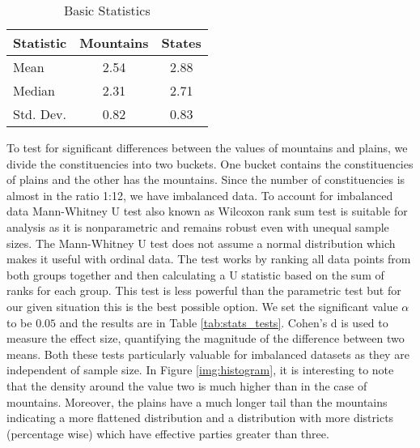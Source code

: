     \label{img:histogram}

\begin{table}[h]
\centering
\begin{tabular}{|l|c|c|}
\hline
Statistic & Mountains & States \\
\hline
Mean & 2.54 & 2.88 \\
Median & 2.31 & 2.71 \\
Std. Dev. & 0.82 & 0.83 \\
\hline
\end{tabular}
\caption{Basic Statistics}

\label{tab:basic_stats}
\end{table}

To test for significant differences between the values of mountains and plains, we divide the constituencies into two buckets. One bucket contains the constituencies of plains and the other has the mountains. Since the number of constituencies is almost in the ratio 1:12, we have imbalanced data. To account for imbalanced data Mann-Whitney U test also known as  Wilcoxon rank sum test is suitable for analysis as it is nonparametric and remains robust even with unequal sample sizes. The Mann-Whitney U test does not assume a normal distribution which makes it  useful with ordinal data. The test works by ranking all data points from both groups together and then calculating a U statistic based on the sum of ranks for each group. This test is less powerful than the parametric test but for our given situation this is the best possible option. We set the significant value $\alpha$ to be $0.05$ and the results are in Table \ref{tab:stats_tests}. Cohen's d is used to measure the effect size, quantifying the magnitude of the difference between two means. Both these tests particularly valuable for imbalanced datasets as they are independent of sample size. In Figure \ref{img:histogram}, it is interesting to note that the density around the value two is much higher than in the case of mountains. Moreover, the plains have a much longer tail than the mountains indicating a more flattened distribution and a distribution with more districts (percentage wise) which have effective parties greater than three. 

